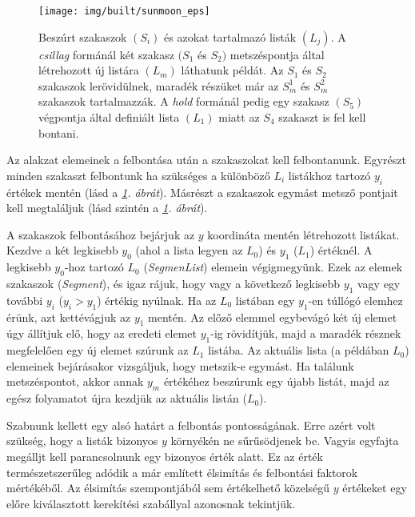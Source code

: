 \documentclass[12pt]{report}
\theoremstyle{definition}
\newcommand{\func}[1]{{\textsl{#1}}}
\begin{document}
  \begin{figure}
    \centering \texttt{[image: img/built/sunmoon\_eps]}
    \caption{\label{sunmoon} Beszúrt
    szakaszok $(S_i)$ és azokat tartalmazó listák $(L_j)$. A \emph{csillag}
    formánál két szakasz $(S_1$ és $S_2)$ metszéspontja által létrehozott új
    listára $(L_m)$ láthatunk példát. Az $S_1$ és $S_2$ szakaszok
    lerövidülnek, maradék részüket már az $S_m^1$ és $S_m^2$ szakaszok
    tartalmazzák. A \emph{hold} formánál pedig egy szakasz $(S_5)$
    végpontja által definiált lista $(L_1)$ miatt az $S_4$ szakaszt is fel
    kell bontani.}
  \end{figure}

Az alakzat elemeinek a felbontása után a szakaszokat kell felbontanunk. Egyrészt
minden szakaszt felbontunk ha szükséges a különböző $L_i$ listákhoz tartozó
$y_i$ értékek mentén (lásd a \emph{\ref{sunmoon}. ábrát}). Másrészt a szakaszok
egymást metsző pontjait kell megtaláljuk (lásd szintén a \emph{\ref{sunmoon}.
ábrát}).

A szakaszok felbontásához bejárjuk az $y$ koordináta mentén létrehozott
listákat. Kezdve a két legkisebb $y_0$ (ahol a lista legyen az $L_0$) és $y_1$
($L_1$) értéknél. A legkisebb $y_0$-hoz tartozó $L_0$ (\func{SegmenList})
elemein végigmegyünk. Ezek az elemek szakaszok (\func{Segment}), és igaz rájuk,
hogy vagy a következő legkisebb $y_1$ vagy egy további $y_i$ ($y_i > y_1$)
értékig nyúlnak. Ha az $L_0$ listában egy $y_1$-en túllógó elemhez érünk, azt
kettévágjuk az $y_1$ mentén. Az előző elemmel egybevágó két új elemet úgy
állítjuk elő, hogy az eredeti elemet $y_1$-ig rövidítjük, majd a maradék
résznek megfelelően egy új elemet szúrunk az $L_1$ listába. Az aktuális lista
(a példában $L_0$) elemeinek bejárásakor vizsgáljuk, hogy metszik-e egymást. Ha
találunk metszéspontot, akkor annak $y_m$ értékéhez beszúrunk egy újabb listát,
majd az egész folyamatot újra kezdjük az aktuális listán ($L_0$).

Szabnunk kellett egy alsó határt a felbontás pontosságának. Erre azért volt
szükség, hogy a listák bizonyos $y$ környékén ne sűrűsödjenek be. Vagyis
egyfajta megálljt kell parancsolnunk egy bizonyos érték alatt. Ez az érték
természetszerűleg adódik a már említett élsimítás és felbontási faktorok
mértékéből. Az élsimítás szempontjából sem értékelhető közelségű $y$ értékeket
egy előre kiválasztott kerekítési szabállyal azonosnak tekintjük.
\end{document}
